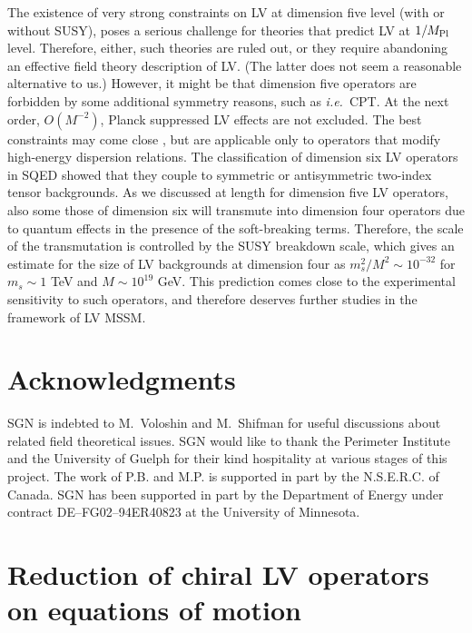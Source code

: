 \documentclass[12pt]{revtex4}
\begin{document}
The existence of very strong constraints on LV at dimension five level
(with or without SUSY), poses a serious challenge for theories that
predict LV at $1/M_{\rm Pl}$ level. Therefore, either, such theories are
ruled out, or they require abandoning an effective field theory
description of LV. (The latter does not seem a  reasonable alternative
to us.) However, it might be that dimension five operators are
forbidden by some additional symmetry reasons, such as {\em i.e.}\
CPT. At the next order, $O(M^{-2})$, Planck suppressed LV effects 
are not excluded. The best constraints may come close
\cite{Gagnon:2004xh},  but are applicable only to operators that
modify high-energy dispersion relations. The classification of
dimension six LV operators in SQED showed that they  couple to
symmetric or antisymmetric two-index tensor backgrounds. 
As we discussed at length for dimension five LV operators, also some
those of dimension six will transmute into dimension four operators
due to quantum effects in the presence of the soft-breaking
terms. Therefore, the scale of the transmutation is controlled by the
SUSY breakdown scale, which gives an estimate for the size of  
LV backgrounds at dimension four as $m_s^2/M^2 \sim 10^{-32}$
for $m_s\sim1$ TeV and $M\sim 10^{19}$ GeV. This prediction 
comes close to the experimental sensitivity to such operators,
and therefore deserves further studies in the framework of LV MSSM. 



\section*{Acknowledgments}


SGN is indebted to M.\ Voloshin and M.\ Shifman for useful discussions
about related field theoretical issues. 
SGN would like to thank the Perimeter Institute and the University of
Guelph for their kind hospitality at various stages of this project. 
The work of P.B. and M.P. is supported in part by the N.S.E.R.C. of Canada. SGN has been supported in part by the Department of Energy 
under contract DE--FG02--94ER40823 at the University of Minnesota.




\appendix


\section{Reduction of chiral LV operators on equations of motion}
\label{app_reduction}
\end{document}
